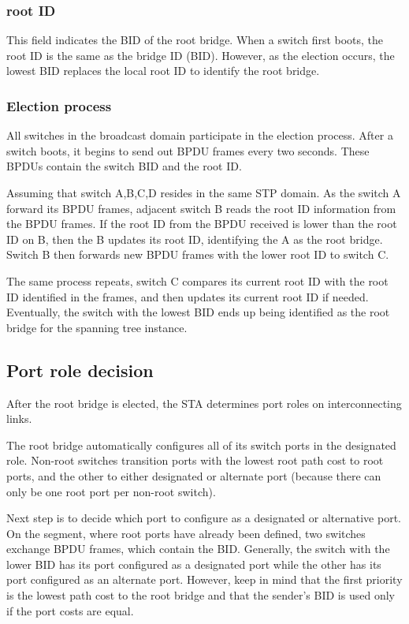 \subsubsection{root ID}
This field indicates the BID of the root bridge. When a switch first boots, the root ID is the same as the bridge ID (BID). However, as the election occurs, the lowest BID replaces the local root ID to identify the root bridge.
\subsubsection{Election process}
All switches in the broadcast domain participate in the election process. After a switch boots, it begins to send out BPDU frames every two seconds. These BPDUs contain the switch BID and the root ID.\par 
Assuming that switch A,B,C,D resides in the same STP domain. As the switch A forward its BPDU frames, adjacent switch B reads the root ID information from the BPDU frames. If the root ID from the BPDU received is lower than the root ID on B, then the B updates its root ID, identifying the A as the root bridge. Switch B then forwards new BPDU frames with the lower root ID to switch C.\par 
The same process repeats, switch C compares its current root ID with the root ID identified in the frames, and then updates its current root ID if needed. Eventually, the switch with the lowest BID ends up being identified as the root bridge for the spanning tree instance.
\subsection{Port role decision}
After the root bridge is elected, the STA determines port roles on interconnecting links.\par 
The root bridge automatically configures all of its switch ports in the designated role. Non-root switches transition ports with the lowest root path cost to root ports, and the other to either  designated or alternate port (because there can only be one root port per non-root switch). \par 
Next step is to decide which port to configure as a designated or alternative port. On the segment, where root ports have already been defined, two switches exchange BPDU frames, which contain the BID. Generally, the switch with the lower BID has its port configured as a designated port while the other has its port configured as an alternate port. However, keep in mind that the first priority is the lowest path cost to the root bridge and that the sender’s BID is used only if the port costs are equal.
